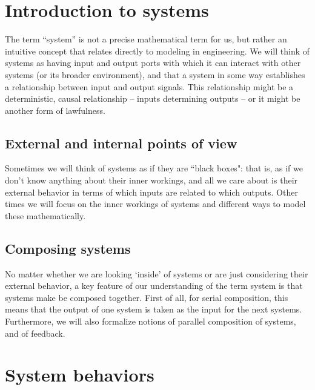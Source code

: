 
\section{Introduction to systems}


The term ``system'' is not a precise mathematical term for us, but rather an intuitive concept that relates directly to modeling in engineering. We will think of systems as having input and output ports with which it can interact with other systems (or its broader environment), and that a system in some way establishes a relationship between input and output signals. This relationship might be a deterministic, causal relationship -- inputs determining outputs -- or it might be another form of lawfulness.

\subsection{External and internal points of view}

Sometimes we will think of systems as if they are ``black boxes": that is, as if we don't know anything about their inner workings, and all we care about is their external behavior in terms of which inputs are related to which outputs. Other times we will focus on the inner workings of systems and different ways to model these mathematically.

\subsection{Composing systems}

No matter whether we are looking `inside' of systems or are just considering their external behavior, a key feature of our understanding of the term system is that systems make be composed together. First of all, for serial composition, this means that the output of one system is taken as the input for the next systems. Furthermore, we will also formalize notions of parallel composition of systems, and of feedback.


\section{System behaviors}

